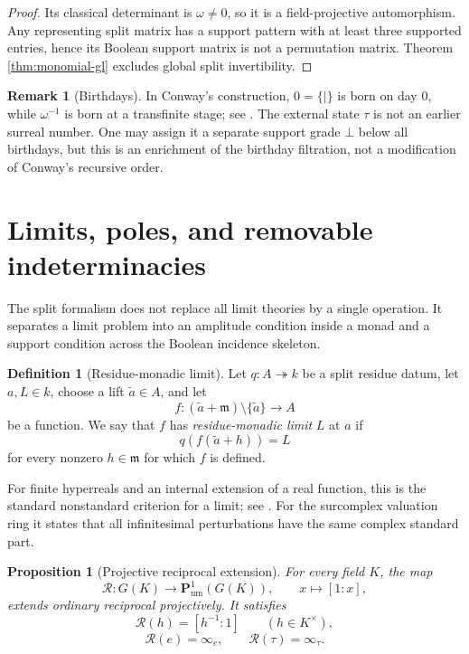 \documentclass[11pt]{amsart}
\numberwithin{equation}{section}
\newtheorem{proposition}[theorem]{Proposition}
\theoremstyle{definition}
\newtheorem{definition}[theorem]{Definition}
\newtheorem{remark}[theorem]{Remark}
\newcommand{\Pum}{\mathbf P_{\mathrm{um}}}
\begin{document}
\begin{proof}
Its classical determinant is $\omega\neq0$, so it is a field-projective automorphism.  Any representing split matrix has a support pattern with at least three supported entries, hence its Boolean support matrix is not a permutation matrix.  Theorem \ref{thm:monomial-gl} excludes global split invertibility.
\end{proof}

\begin{remark}[Birthdays]
In Conway's construction, $0=\{\mid\}$ is born on day $0$, while $\omega^{-1}$ is born at a transfinite stage; see \cite{Conway,Simons}.  The external state $\tau$ is not an earlier surreal number.  One may assign it a separate support grade $\bot$ below all birthdays, but this is an enrichment of the birthday filtration, not a modification of Conway's recursive order.
\end{remark}

\section{Limits, poles, and removable indeterminacies}

The split formalism does not replace all limit theories by a single operation.  It separates a limit problem into an amplitude condition inside a monad and a support condition across the Boolean incidence skeleton.

\begin{definition}[Residue-monadic limit]\label{def:monadic-limit}
Let $q:A\twoheadrightarrow k$ be a split residue datum, let $a,L\in k$, choose a lift $\widetilde a\in A$, and let
\[
f:(\widetilde a+\mathfrak m)\setminus\{\widetilde a\}\longrightarrow A
\]
be a function.  We say that $f$ has \emph{residue-monadic limit} $L$ at $a$ if
\[
q(f(\widetilde a+h))=L
\]
for every nonzero $h\in\mathfrak m$ for which $f$ is defined.
\end{definition}

For finite hyperreals and an internal extension of a real function, this is the standard nonstandard criterion for a limit; see \cite{Robinson,Goldblatt}.  For the surcomplex valuation ring it states that all infinitesimal perturbations have the same complex standard part.

\begin{proposition}[Projective reciprocal extension]\label{prop:reciprocal-extension}
For every field $K$, the map
\[
\mathcal R:G(K)\longrightarrow\Pum^1(G(K)),
\qquad
x\longmapsto[1:x],
\]
extends ordinary reciprocal projectively.  It satisfies
\[
\mathcal R(h)=[h^{-1}:1]
\qquad(h\in K^\times),
\]
\[
\mathcal R(e)=\infty_e,
\qquad
\mathcal R(\tau)=\infty_\tau.
\]
\end{proposition}
\end{document}
